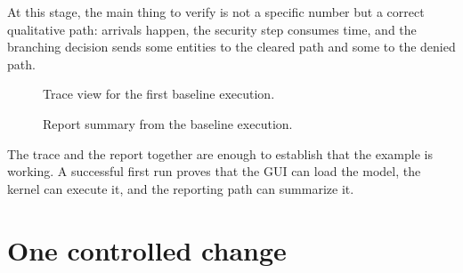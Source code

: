 At this stage, the main thing to verify is not a specific number but a correct
qualitative path: arrivals happen, the security step consumes time, and the
branching decision sends some entities to the cleared path and some to the
denied path.

\begin{figure}[htbp]
\centering
\caption{Trace view for the first baseline execution.}
\label{fig:first-model-trace}
\end{figure}

\begin{figure}[htbp]
\centering
\caption{Report summary from the baseline execution.}
\label{fig:first-model-report}
\end{figure}

The trace and the report together are enough to establish that the example is
working. A successful first run proves that the GUI can load the model, the
kernel can execute it, and the reporting path can summarize it.

\section{One controlled change}
\label{sec:first-model-controlled-change}

